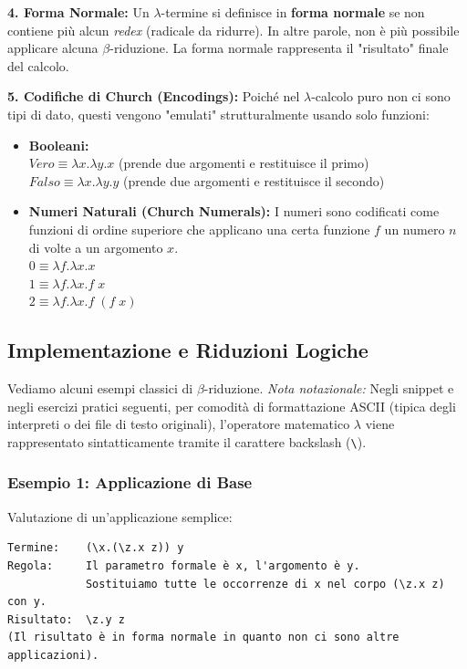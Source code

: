 \documentclass[12pt, a4paper]{article}
\begin{document}
\textbf{4. Forma Normale:}
Un $\lambda$-termine si definisce in \textbf{forma normale} se non contiene più alcun \textit{redex} (radicale da ridurre). In altre parole, non è più possibile applicare alcuna $\beta$-riduzione. La forma normale rappresenta il "risultato" finale del calcolo.

\textbf{5. Codifiche di Church (Encodings):}
Poiché nel $\lambda$-calcolo puro non ci sono tipi di dato, questi vengono "emulati" strutturalmente usando solo funzioni:
\begin{itemize}
    \item \textbf{Booleani:} \\
    $Vero \equiv \lambda x.\lambda y.x$ (prende due argomenti e restituisce il primo)\\
    $Falso \equiv \lambda x.\lambda y.y$ (prende due argomenti e restituisce il secondo)
    \item \textbf{Numeri Naturali (Church Numerals):} I numeri sono codificati come funzioni di ordine superiore che applicano una certa funzione $f$ un numero $n$ di volte a un argomento $x$. \\
    $0 \equiv \lambda f.\lambda x.x$ \\
    $1 \equiv \lambda f.\lambda x.f\; x$ \\
    $2 \equiv \lambda f.\lambda x.f\; (f\; x)$
\end{itemize}


\subsection{Implementazione e Riduzioni Logiche}

Vediamo alcuni esempi classici di $\beta$-riduzione. 
\textit{Nota notazionale:} Negli snippet e negli esercizi pratici seguenti, per comodità di formattazione ASCII (tipica degli interpreti o dei file di testo originali), l'operatore matematico $\lambda$ viene rappresentato sintatticamente tramite il carattere backslash (\texttt{\textbackslash}).

\subsubsection{Esempio 1: Applicazione di Base}
Valutazione di un'applicazione semplice:
\begin{verbatim}
Termine:    (\x.(\z.x z)) y
Regola:     Il parametro formale è x, l'argomento è y. 
            Sostituiamo tutte le occorrenze di x nel corpo (\z.x z) con y.
Risultato:  \z.y z
(Il risultato è in forma normale in quanto non ci sono altre applicazioni).
\end{verbatim}
\end{document}
